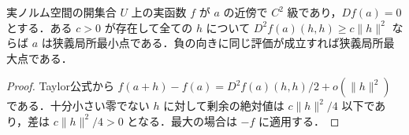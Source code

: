 \begin{prop}[正定値な第二微分と狭義局所最小]
実ノルム空間の開集合 $U$ 上の実函数 $f$ が $a$ の近傍で $C^2$ 級であり，$Df(a)=0$ とする．ある $c>0$ が存在して全ての $h$ について $D^2f(a)(h,h)\geq c\|h\|^2$ ならば $a$ は狭義局所最小点である．負の向きに同じ評価が成立すれば狭義局所最大点である．
\end{prop}
\begin{proof}
Taylor公式から $f(a+h)-f(a)=D^2f(a)(h,h)/2+o(\|h\|^2)$ である．十分小さい零でない $h$ に対して剰余の絶対値は $c\|h\|^2/4$ 以下であり，差は $c\|h\|^2/4>0$ となる．最大の場合は $-f$ に適用する．
\end{proof}
